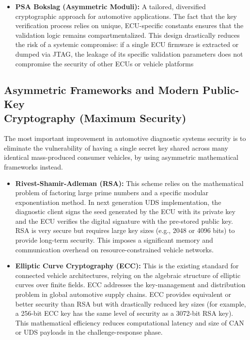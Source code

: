 \begin{itemize}
    \item \textbf{PSA Bokslag (Asymmetric Moduli)\cite{PSABokslag}:} A tailored, diversified cryptographic approach for automotive applications. The fact that the key verification process relies on unique, \gls{ECU}-specific constants ensures that the validation logic remains compartmentalized. This design drastically reduces the risk of a systemic compromise: if a single \gls{ECU} firmware is extracted or dumped via \gls{JTAG}, the leakage of its specific validation parameters does not compromise the security of other \glspl{ECU} or vehicle platforms
    
\end{itemize}


\subsection[Asymmetric Frameworks and Modern Public-Key Cryptography]{Asymmetric Frameworks and Modern Public-Key \\ Cryptography (Maximum Security)}

The most important improvement in automotive diagnostic systems security is to eliminate the vulnerability of having a single secret key shared across many identical mass-produced consumer vehicles, by using asymmetric mathematical frameworks instead.
\begin{itemize}
    \item \textbf{Rivest-Shamir-Adleman (RSA):}  This scheme relies on the mathematical problem of factoring large prime numbers and a specific modular exponentiation method. In next generation UDS implementation, the diagnostic client signs the seed generated by the \gls{ECU} with its private key and the \gls{ECU} verifies the digital signature with the pre-stored public key. \gls{RSA} is very secure but requires large key sizes (e.g., 2048 or 4096 bits) to provide long-term security. This imposes a significant memory and communication overhead on resource-constrained vehicle networks.
    \item \textbf{Elliptic Curve Cryptography (ECC):} This is the existing standard for connected vehicle architectures, relying on the algebraic structure of elliptic curves over finite fields. \gls{ECC} addresses the key-management and distribution problem in global automotive supply chains. \gls{ECC} provides equivalent or better security than \gls{RSA} but with drastically reduced key sizes (for example, a 256-bit \gls{ECC} key has the same level of security as a 3072-bit \gls{RSA} key). This mathematical efficiency reduces computational latency and size of \gls{CAN} or \gls{UDS} payloads in the challenge-response phase.
\end{itemize}


